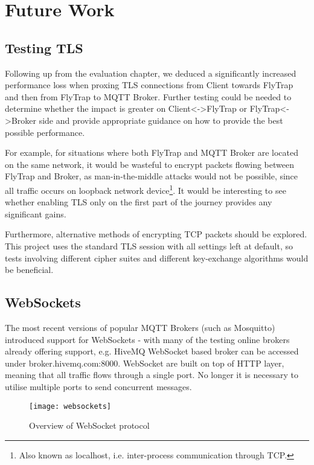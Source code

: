 \section{Future Work}

\subsection{Testing TLS}
Following up from the evaluation chapter, we deduced a significantly increased performance loss when proxing TLS connections from Client towards FlyTrap and then from FlyTrap to MQTT Broker. Further testing could be needed to determine whether the impact is greater on \mbox{Client<->FlyTrap} or FlyTrap<->Broker side and provide appropriate guidance on how to provide the best possible performance.

For example, for situations where both FlyTrap and MQTT Broker are located on the same network, it would be wasteful to encrypt packets flowing between FlyTrap and Broker, as man-in-the-middle attacks would not be possible, since all traffic occurs on loopback network device\footnote{Also known as localhost, i.e. inter-process communication through TCP.}. It would be interesting to see whether enabling TLS only on the first part of the journey provides any significant gains.

Furthermore, alternative methods of encrypting TCP packets should be explored. This project uses the standard TLS session with all settings left at default, so tests involving different cipher suites and different key-exchange algorithms would be beneficial.
\subsection{WebSockets}
The most recent versions of popular MQTT Brokers (such as Mosquitto) introduced support for WebSockets - with many of the testing online brokers already offering support, e.g. HiveMQ WebSocket based broker can be accessed under broker.hivemq.com:8000. WebSocket \cite{fette2011websocket} are built on top of HTTP layer, meaning that all traffic flows through a single port. No longer it is necessary to utilise multiple ports to send concurrent messages.

\begin{figure}[h]
    \centering
    \texttt{[image: websockets]}
    \caption{Overview of WebSocket protocol}
    \label{fig:websockets}
\end{figure}

